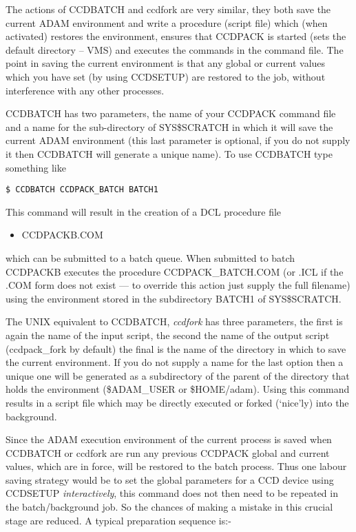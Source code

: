The actions of CCDBATCH and ccdfork are very similar, they both save the
current ADAM environment and write a procedure (script file) which (when
activated) restores the environment, ensures that CCDPACK is started
(sets the default directory -- VMS) and executes the commands in the
command file. The point in saving the current environment is that any
global or current values which you have set (by using CCDSETUP) are
restored to the job, without interference with any other processes.

CCDBATCH has two parameters, the name of your CCDPACK command file and
a name for the sub-directory of SYS\$SCRATCH in which it will save the
current ADAM environment (this last parameter is optional, if you do
not supply it then CCDBATCH will generate a unique name).
To use CCDBATCH type something like
\begin{myquote}
\begin{verbatim}
$ CCDBATCH CCDPACK_BATCH BATCH1
\end{verbatim}
\end{myquote}
This command will result in the creation of a DCL procedure file
\begin{itemize}
\item CCDPACKB.COM
\end{itemize}
which can be submitted to a batch queue. When submitted to batch
CCDPACKB  executes the procedure CCDPACK\_BATCH.COM (or .ICL if the .COM
form does not exist --- to override this action just supply the full
filename) using the environment stored in the subdirectory BATCH1 of
SYS\$SCRATCH.

The UNIX equivalent to CCDBATCH, {\em ccdfork} has three parameters, the
first is again the name of the input script, the second the name of the
output script (ccdpack\_fork by default) the final is the name of the
directory in which to save the current environment. If you do not supply
a name for the last option then a unique one will be generated as a
subdirectory of the parent of the directory that holds the environment
(\$ADAM\_USER or \$HOME/adam). Using this command results in a script file
which may be directly executed or forked (`nice'ly) into the background.

Since the ADAM execution environment of the current process is saved
when CCDBATCH or ccdfork are run any previous CCDPACK global and
current values, which are in force, will be restored to the batch
process. Thus one labour saving strategy would be to set the global
parameters for a CCD device using CCDSETUP {\em interactively}, this
command does not then need to be repeated in the batch/background job.
So the chances of making a mistake in this crucial stage are reduced. A
typical preparation sequence is:-

